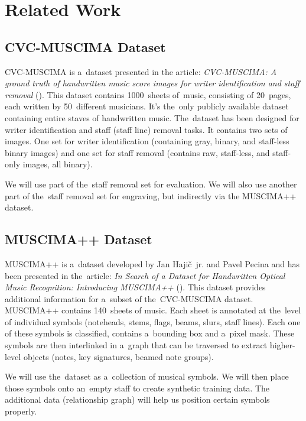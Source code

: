 \chapter{Related Work}
\label{chap:RelatedWork}


\section{CVC-MUSCIMA Dataset}

CVC-MUSCIMA is a~dataset presented in the article: \emph{CVC-MUSCIMA: A ground truth of handwritten music score images for writer identification and staff removal} (\cite{CvcMuscima}). This dataset contains 1000~sheets of~music, consisting of 20~pages, each written by 50~different musicians. It's the~only publicly available dataset containing entire staves of handwritten music. The~dataset has been designed for writer identification and staff (staff line) removal tasks. It contains two sets of images. One set for writer identification (containing gray, binary, and staff-less binary images) and one set for staff removal (contains raw, staff-less, and staff-only images, all binary).

We will use part of the~staff removal set for evaluation. We will also use another part of the~staff removal set for engraving, but indirectly via the MUSCIMA++ dataset.


\section{MUSCIMA++ Dataset}

MUSCIMA++ is a~dataset developed by Jan Hajič~jr. and Pavel Pecina and has been presented in the~article: \emph{In Search of a Dataset for Handwritten Optical Music Recognition: Introducing MUSCIMA++} (\cite{MuscimaPP}). This dataset provides additional information for a~subset of the~CVC-MUSCIMA dataset. MUSCIMA++ contains 140~sheets of music. Each sheet is annotated at the~level of individual symbols (noteheads, stems, flags, beams, slurs, staff lines). Each one of these symbols is classified, contains a~bounding box and a~pixel mask. These symbols are then interlinked in a~graph that can be traversed to extract higher-level objects (notes, key signatures, beamed note groups).

We will use the~dataset as a~collection of musical symbols. We will then place those symbols onto an~empty staff to create synthetic training data. The additional data (relationship graph) will help us position certain symbols properly.


